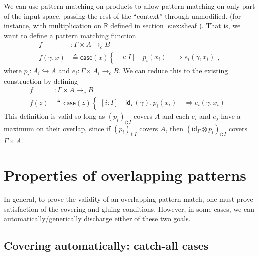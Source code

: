 \documentclass[conference]{IEEEtran}
\newcommand{\hookto}{\hookrightarrow}
\newcommand{\cto}{\to_c}
\newcommand{\R}{\mathbb{R}}
\newcommand{\Branch}{\Rightarrow}
\begin{document}
We can use pattern matching on products to allow pattern matching on only part of the input space, passing the rest of the ``context'' through unmodified. (for instance, with multiplication on $\R$ defined in section \ref{s:ex:sheaf}). That is, we want to define a pattern matching function
\begin{align*}
f &: \Gamma \times A \cto B
\\ f(\gamma, x) &\triangleq \mathsf{case}(x)
\begin{cases}
[i : I] \quad p_i(x_i) \quad \Branch e_i(\gamma, x_i)
\end{cases},
\end{align*}
where $p_i : A_i \hookto A$ and $e_i : \Gamma \times A_i \cto B$.
We can reduce this to the existing construction by defining
\begin{align*}
f &: \Gamma \times A \cto B
\\ f(z) &\triangleq \mathsf{case}(z)
\begin{cases}
[i : I] \quad \mathsf{id}_\Gamma(\gamma) , p_i(x_i) \quad \Branch e_i(\gamma, x_i)
\end{cases}.
\end{align*}
This definition is valid so long as $(p_i)_{i : I}$ covers $A$ and each $e_i$ and $e_j$ have a maximum on their overlap, since if $(p_i)_{i : I}$ covers $A$, then $(\mathsf{id}_\Gamma \otimes p_i)_{i : I}$ covers $\Gamma \times A$.


\section{Properties of overlapping patterns}
\label{s:properties}

In general, to prove the validity of an overlapping pattern match, one must prove satisfaction of the covering and gluing conditions. However, in some cases, we can automatically/generically discharge either of these two goals. 

\subsection{Covering automatically: catch-all cases}
\end{document}
